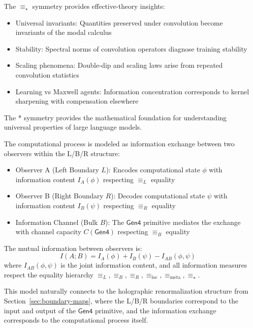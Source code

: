 \begin{theorem}
\begin{theorem}
\label{thm:effective-theory-payoffs}
The $\equiv_\star$ symmetry provides effective-theory insights:
\begin{itemize}
\item Universal invariants: Quantities preserved under convolution become invariants of the modal calculus
\item Stability: Spectral norms of convolution operators diagnose training stability
\item Scaling phenomena: Double-dip and scaling laws arise from repeated convolution statistics
\item Learning vs Maxwell agents: Information concentration corresponds to kernel sharpening with compensation elsewhere
\end{itemize}
The * symmetry provides the mathematical foundation for understanding universal properties of large language models.
\end{theorem}

\begin{definition}
\label{def:two-observer-exchange-lbr}
The computational process is modeled as information exchange between two observers within the L/B/R structure:
\begin{itemize}
\item Observer A (Left Boundary $L$): Encodes computational state $\phi$ with information content $I_A(\phi)$ respecting $\equiv_L$ equality
\item Observer B (Right Boundary $R$): Decodes computational state $\psi$ with information content $I_B(\psi)$ respecting $\equiv_R$ equality
\item Information Channel (Bulk $B$): The $\mathsf{Gen4}$ primitive mediates the exchange with channel capacity $C(\mathsf{Gen4})$ respecting $\equiv_B$ equality
\end{itemize}
The mutual information between observers is:
\[
I(A;B) = I_A(\phi) + I_B(\psi) - I_{AB}(\phi,\psi)
\]
where $I_{AB}(\phi,\psi)$ is the joint information content, and all information measures respect the equality hierarchy $\equiv_L, \equiv_B, \equiv_R, \equiv_{\text{loc}}, \equiv_{\text{meta}}, \equiv_\star$.
\end{definition}

This model naturally connects to the holographic renormalization structure from Section~\ref{sec:boundary-maps}, where the L/B/R boundaries correspond to the input and output of the $\mathsf{Gen4}$ primitive, and the information exchange corresponds to the computational process itself.


\end{theorem}
